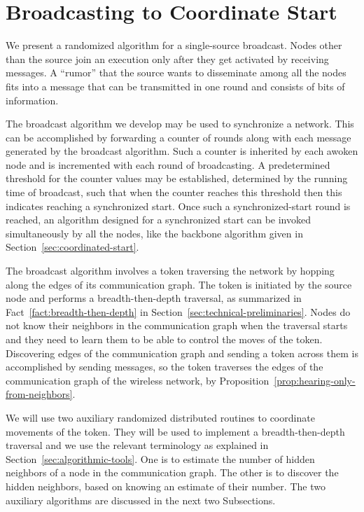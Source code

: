 \documentclass[11pt]{article}
\begin{document}
\section{Broadcasting to Coordinate Start}

\label{sec:single-node-start}



We present a randomized algorithm for a single-source broadcast.
Nodes other than the source join an execution only after they get activated by receiving messages. 
A ``rumor'' that the source wants to disseminate among all the nodes fits into a message that can be transmitted in one round and consists of  bits of information.

The broadcast algorithm we develop may be used to synchronize a network.
This can be accomplished by forwarding a counter of rounds along with each message generated  by the broadcast algorithm.
Such a counter is inherited by each awoken node and is incremented with each round of broadcasting.
A predetermined threshold for the counter values may be established, determined by the running time of broadcast, such that when the counter reaches this threshold then this indicates reaching a synchronized start.
Once  such a synchronized-start round is reached, an algorithm designed for a synchronized start can be invoked simultaneously by all the nodes, like the backbone algorithm given in Section~\ref{sec:coordinated-start}.

The broadcast algorithm involves a token traversing the network by hopping along the edges of its communication graph. 
The token is initiated by the source node and performs a breadth-then-depth traversal, as summarized in Fact~\ref{fact:breadth-then-depth} in Section~\ref{sec:technical-preliminaries}.
Nodes do not know their neighbors in the communication graph when the traversal starts and they need to learn them to be able to control the moves of the token.
Discovering edges of the communication graph and sending a token across them is accomplished by sending messages, so the token traverses the edges of the communication graph of the wireless network, by Proposition~\ref{prop:hearing-only-from-neighbors}.


We will use two auxiliary randomized distributed routines to coordinate movements of the token.
They will be used to implement a breadth-then-depth traversal and we use the relevant terminology as explained in Section~\ref{sec:algorithmic-tools}.
One is to estimate the number of hidden neighbors of a node in the communication graph.
The other is to discover the hidden neighbors, based on knowing an estimate of their number.
The two auxiliary algorithms are discussed in the next two Subsections.
\end{document}
